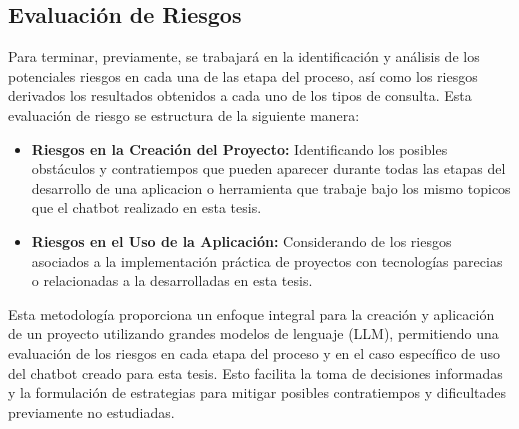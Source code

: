 \subsection{Evaluación de Riesgos}

Para terminar, previamente, se trabajará en la identificación y análisis de los potenciales riesgos  en cada una de las etapa del proceso, así como los riesgos derivados
los resultados obtenidos a cada uno de los tipos de consulta. Esta evaluación de riesgo se estructura de la siguiente manera:

\begin{itemize}
    \item \textbf{Riesgos en la Creación del Proyecto:} Identificando los posibles obstáculos y contratiempos que pueden aparecer durante todas las etapas del desarrollo de una aplicacion o  herramienta que trabaje bajo los mismo topicos que el chatbot realizado en esta tesis.
    \item \textbf{Riesgos en el Uso de la Aplicación:} Considerando de los riesgos asociados a la implementación práctica de proyectos con tecnologías parecias o relacionadas a la desarrolladas en esta tesis.
\end{itemize}

Esta metodología proporciona un enfoque integral para la creación y aplicación de un proyecto utilizando grandes modelos de lenguaje (LLM), permitiendo una evaluación de los riesgos en cada etapa del proceso y en el caso específico de uso del chatbot creado para esta tesis. Esto facilita la toma de decisiones informadas y la formulación de estrategias para mitigar posibles contratiempos y dificultades previamente no estudiadas.


